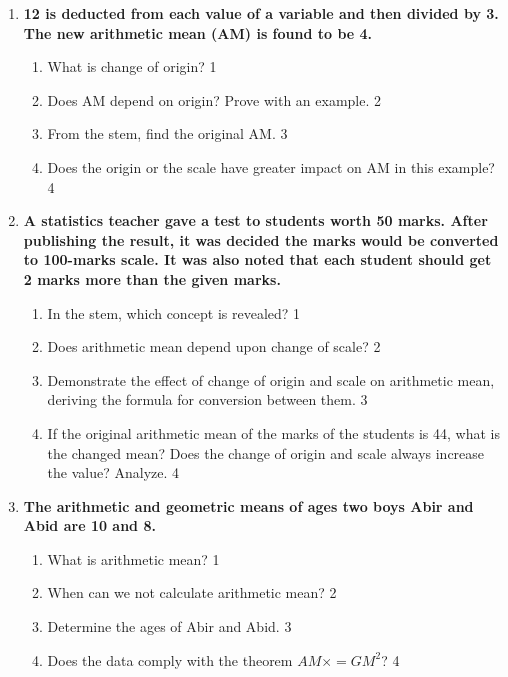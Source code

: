 \documentclass[a4paper,oneside]{book}
\begin{document}
\begin{enumerate}
  
   \item
	  \textbf{12 is deducted from each value of a variable and then divided by 3. The new arithmetic mean (AM) is found to be 4.} 
  
  \begin{enumerate}
    \item
	What is change of origin? \hfill 1
    \item
	Does AM depend on origin? Prove with an example. \hfill 2
    \item  
	From the stem, find the original AM. \hfill 3
    \item
	Does the origin or the scale have greater impact on AM in this example? \hfill 4
  \end{enumerate}
  
   \item
	  \textbf{A statistics teacher gave a test to students worth 50 marks. After publishing the result, it was decided the marks would be converted to 100-marks scale. It was also noted that each student should get 2 marks more than the given marks.} 
  
  \begin{enumerate}
    \item
	In the stem, which concept is revealed? \hfill 1
    \item
	Does arithmetic mean depend upon change of scale? \hfill 2
    \item  
	Demonstrate the effect of change of origin and scale on arithmetic mean, deriving the formula for conversion between them. \hfill 3
    \item 
    If the original arithmetic mean of the marks of the students is 44, what is the changed mean? Does the change of origin and scale always increase the value? Analyze.
	 \hfill 4
  \end{enumerate}

   \item
	  \textbf{The arithmetic and geometric means of ages two boys Abir and Abid are 10 and 8.} 
  
  \begin{enumerate}
    \item
	What is arithmetic mean? \hfill 1
    \item
	When can we not calculate arithmetic mean? \hfill 2
    \item  
	Determine the ages of Abir and Abid. \hfill 3
    \item
	Does the data comply with the theorem $\displaystyle AM \times  = GM^2$? \hfill 4
  \end{enumerate}
  

\end{enumerate}
\end{document}
